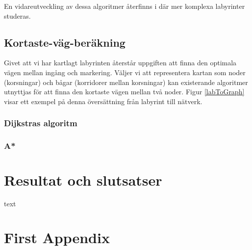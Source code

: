 \documentclass[11pt]{article}
\begin{document}
\begin{flushleft}
En vidareutveckling av dessa algoritmer återfinns i \cite{flood} där mer komplexa labyrinter studeras.

\subsection{Kortaste-väg-beräkning}
\label{optimalvag}
Givet att vi har kartlagt labyrinten återstår uppgiften att finna den optimala vägen mellan ingång och markering. Väljer vi att representera kartan som noder (korsningar) och bågar (korridorer mellan korsningar) kan existerande algoritmer utnyttjas för att finna den kortaste vägen mellan två noder. Figur \ref{labToGraph} visar ett exempel på denna översättning från labyrint till nätverk. 

\subsubsection{Dijkstras algoritm}

\subsubsection{A*}

\pagebreak
\section{Resultat och slutsatser}
text

\pagebreak
{}



\pagebreak
\appendix
\section{First Appendix}

\end{flushleft}
\end{document}
